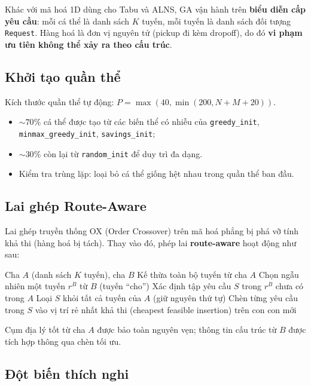 \documentclass[12pt, a4paper]{article}
\begin{document}
Khác với mã hoá 1D dùng cho Tabu và ALNS, GA vận hành trên \textbf{biểu diễn cấp yêu cầu}: mỗi cá thể là danh sách $K$ tuyến, mỗi tuyến là danh sách đối tượng \texttt{Request}. Hàng hoá là đơn vị nguyên tử (pickup đi kèm dropoff), do đó \textbf{vi phạm ưu tiên không thể xảy ra theo cấu trúc}.

\subsection{Khởi tạo quần thể}

Kích thước quần thể tự động: $P = \max(40, \min(200, N+M+20))$.

\begin{itemize}[noitemsep]
  \item $\sim 70\%$ cá thể được tạo từ các biến thể có nhiễu của \texttt{greedy\_init}, \texttt{minmax\_greedy\_init}, \texttt{savings\_init};
  \item $\sim 30\%$ còn lại từ \texttt{random\_init} để duy trì đa dạng.
  \item Kiểm tra trùng lặp: loại bỏ cá thể giống hệt nhau trong quần thể ban đầu.
\end{itemize}

\subsection{Lai ghép Route-Aware}

Lai ghép truyền thống OX (Order Crossover) trên mã hoá phẳng bị phá vỡ tính khả thi (hàng hoá bị tách). Thay vào đó, phép lai \textbf{route-aware} hoạt động như sau:

\begin{algorithm}[H]
\caption{Route-Aware Crossover}
\begin{algorithmic}[1]
\Require Cha $A$ (danh sách $K$ tuyến), cha $B$
\State Kế thừa toàn bộ tuyến từ cha $A$
\State Chọn ngẫu nhiên một tuyến $r^B$ từ $B$ (tuyến ``cho'')
\State Xác định tập yêu cầu $S$ trong $r^B$ chưa có trong $A$
\State Loại $S$ khỏi tất cả tuyến của $A$ (giữ nguyên thứ tự)
\State Chèn từng yêu cầu trong $S$ vào vị trí rẻ nhất khả thi (cheapest feasible insertion) trên con
\State \Return con mới
\end{algorithmic}
\end{algorithm}

Cụm địa lý tốt từ cha $A$ được bảo toàn nguyên vẹn; thông tin cấu trúc từ $B$ được tích hợp thông qua chèn tối ưu.

\subsection{Đột biến thích nghi}
\end{document}
